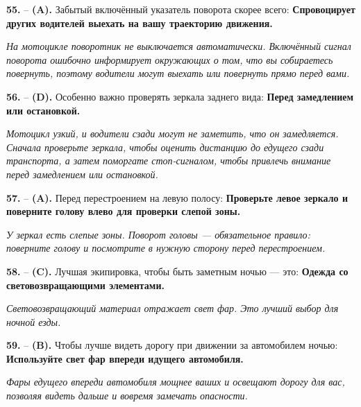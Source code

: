 \begin{minipage}{\linewidth}
\noindent\textbf{55.}  -- \textbf {(A).} Забытый включённый указатель поворота скорее всего:  \textbf {Спровоцирует других водителей выехать на вашу траекторию движения.} \par \textit {На мотоцикле поворотник не выключается автоматически. Включённый сигнал поворота ошибочно информирует окружающих о том, что вы собираетесь повернуть, поэтому водители могут выехать или повернуть прямо перед вами.} \\
\end{minipage}

\begin{minipage}{\linewidth}
\noindent\textbf{56.}  -- \textbf {(D).} Особенно важно проверять зеркала заднего вида:  \textbf {Перед замедлением или остановкой.} \par \textit {Мотоцикл узкий, и водители сзади могут не заметить, что он замедляется. Сначала проверьте зеркала, чтобы оценить дистанцию до едущего сзади транспорта, а затем поморгате стоп-сигналом, чтобы привлечь внимание перед замедлением или остановкой.} \\
\end{minipage}

\begin{minipage}{\linewidth}
\noindent\textbf{57.}  -- \textbf {(A).} Перед перестроением на левую полосу:  \textbf {Проверьте левое зеркало и поверните голову влево для проверки слепой зоны.} \par \textit {У зеркал есть слепые зоны. Поворот головы — обязательное правило: поверните голову и посмотрите в нужную сторону перед перестроением.} \\
\end{minipage}

\begin{minipage}{\linewidth}
\noindent\textbf{58.}  -- \textbf {(C).} Лучшая экипировка, чтобы быть заметным ночью — это:  \textbf {Одежда со световозвращающими элементами.} \par \textit {Световозвращающий материал отражает свет фар. Это лучший выбор для ночной езды.} \\
\end{minipage}

\begin{minipage}{\linewidth}
\noindent\textbf{59.}  -- \textbf {(B).} Чтобы лучше видеть дорогу при движении за автомобилем ночью:  \textbf {Используйте свет фар впереди идущего автомобиля.} \par \textit {Фары едущего впереди автомобиля мощнее ваших и освещают дорогу для вас, позволяя видеть дальше и вовремя замечать опасности.} \\
\end{minipage}


